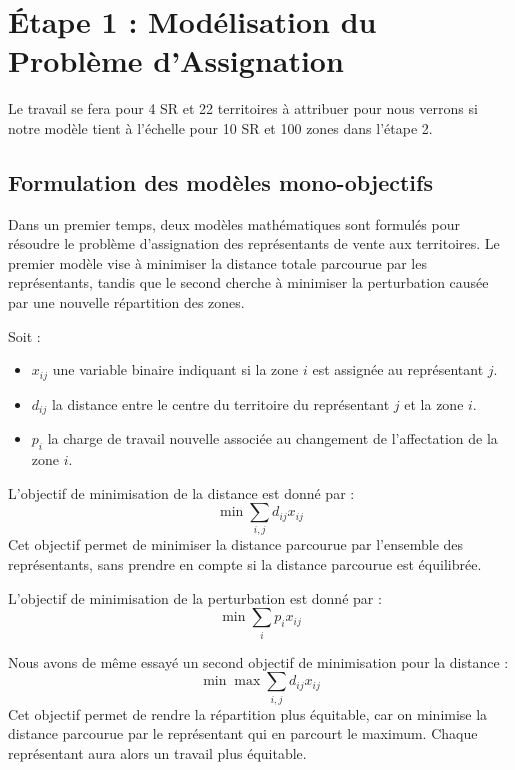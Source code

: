 \section{Étape 1 : Modélisation du Problème d'Assignation}

Le travail se fera pour 4 SR et 22 territoires à attribuer pour nous verrons si notre modèle tient à l'échelle pour 10 SR et 100 zones dans l'étape 2.

\subsection{Formulation des modèles mono-objectifs}
Dans un premier temps, deux modèles mathématiques sont formulés pour résoudre le problème d'assignation des représentants de vente aux territoires. 
Le premier modèle vise à minimiser la distance totale parcourue par les représentants, tandis que le second cherche à minimiser la perturbation causée par une nouvelle répartition des zones.

Soit :
\begin{itemize}
    \item $x_{ij}$ une variable binaire indiquant si la zone $i$ est assignée au représentant $j$.
    \item $d_{ij}$ la distance entre le centre du territoire du représentant $j$ et la zone $i$.
    \item $p_i$ la charge de travail nouvelle associée au changement de l'affectation de la zone $i$.
\end{itemize}

L'objectif de minimisation de la distance est donné par :
\begin{equation}
    \min \sum_{i,j} d_{ij} x_{ij}
\end{equation}
Cet objectif permet de minimiser la distance parcourue par l'ensemble des représentants, sans prendre en compte si la distance parcourue est équilibrée.

L'objectif de minimisation de la perturbation est donné par :
\begin{equation}
    \min \sum_{i} p_i x_{ij}
\end{equation}

Nous avons de même essayé un second objectif de minimisation pour la distance :
\begin{equation}
    \min \max \sum_{i,j} d_{ij} x_{ij}
\end{equation}
Cet objectif permet de rendre la répartition plus équitable, car on minimise la distance parcourue par le représentant qui en parcourt le maximum. Chaque représentant aura alors un travail plus équitable.

